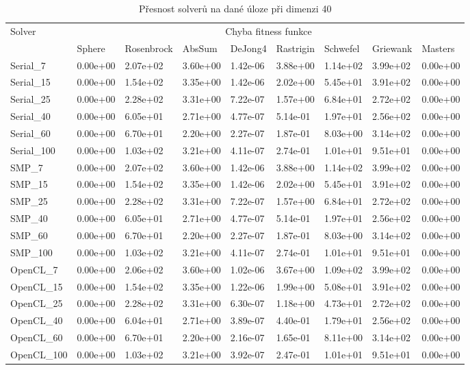 \documentclass[12pt, a4paper]{report}
\begin{document}
\begin{table}
	\scriptsize
	\caption{Přesnost solverů na dané úloze při dimenzi 40}
	\centering
	\label{tbl:results40}
	\begin{tabular}{l|l|l|l|l|l|l|l|l}
		\multirow{2}{*}{Solver} & \multicolumn{8}{c}{Chyba fitness funkce} \\
		& Sphere & Rosenbrock & AbsSum & DeJong4 & Rastrigin & Schwefel & Griewank & Masters \\
		\hline
		\hline
		Serial\_7 & 0.00e+00 & 2.07e+02 & 3.60e+00 & 1.42e-06 & 3.88e+00 & 1.14e+02 & 3.99e+02 & 0.00e+00 \\
		Serial\_15 & 0.00e+00 & 1.54e+02 & 3.35e+00 & 1.42e-06 & 2.02e+00 & 5.45e+01 & 3.91e+02 & 0.00e+00 \\
		Serial\_25 & 0.00e+00 & 2.28e+02 & 3.31e+00 & 7.22e-07 & 1.57e+00 & 6.84e+01 & 2.72e+02 & 0.00e+00 \\
		Serial\_40 & 0.00e+00 & 6.05e+01 & 2.71e+00 & 4.77e-07 & 5.14e-01 & 1.97e+01 & 2.56e+02 & 0.00e+00 \\
		Serial\_60 & 0.00e+00 & 6.70e+01 & 2.20e+00 & 2.27e-07 & 1.87e-01 & 8.03e+00 & 3.14e+02 & 0.00e+00 \\
		Serial\_100 & 0.00e+00 & 1.03e+02 & 3.21e+00 & 4.11e-07 & 2.74e-01 & 1.01e+01 & 9.51e+01 & 0.00e+00 \\
		\hline
		SMP\_7 & 0.00e+00 & 2.07e+02 & 3.60e+00 & 1.42e-06 & 3.88e+00 & 1.14e+02 & 3.99e+02 & 0.00e+00 \\
		SMP\_15 & 0.00e+00 & 1.54e+02 & 3.35e+00 & 1.42e-06 & 2.02e+00 & 5.45e+01 & 3.91e+02 & 0.00e+00 \\
		SMP\_25 & 0.00e+00 & 2.28e+02 & 3.31e+00 & 7.22e-07 & 1.57e+00 & 6.84e+01 & 2.72e+02 & 0.00e+00 \\
		SMP\_40 & 0.00e+00 & 6.05e+01 & 2.71e+00 & 4.77e-07 & 5.14e-01 & 1.97e+01 & 2.56e+02 & 0.00e+00 \\
		SMP\_60 & 0.00e+00 & 6.70e+01 & 2.20e+00 & 2.27e-07 & 1.87e-01 & 8.03e+00 & 3.14e+02 & 0.00e+00 \\
		SMP\_100 & 0.00e+00 & 1.03e+02 & 3.21e+00 & 4.11e-07 & 2.74e-01 & 1.01e+01 & 9.51e+01 & 0.00e+00 \\
		\hline
		OpenCL\_7 & 0.00e+00 & 2.06e+02 & 3.60e+00 & 1.02e-06 & 3.67e+00 & 1.09e+02 & 3.99e+02 & 0.00e+00 \\
		OpenCL\_15 & 0.00e+00 & 1.54e+02 & 3.35e+00 & 1.22e-06 & 1.99e+00 & 5.08e+01 & 3.91e+02 & 0.00e+00 \\
		OpenCL\_25 & 0.00e+00 & 2.28e+02 & 3.31e+00 & 6.30e-07 & 1.18e+00 & 4.73e+01 & 2.72e+02 & 0.00e+00 \\
		OpenCL\_40 & 0.00e+00 & 6.04e+01 & 2.71e+00 & 3.89e-07 & 4.40e-01 & 1.79e+01 & 2.56e+02 & 0.00e+00 \\
		OpenCL\_60 & 0.00e+00 & 6.70e+01 & 2.20e+00 & 2.16e-07 & 1.65e-01 & 8.11e+00 & 3.14e+02 & 0.00e+00 \\
		OpenCL\_100 & 0.00e+00 & 1.03e+02 & 3.21e+00 & 3.92e-07 & 2.47e-01 & 1.01e+01 & 9.51e+01 & 0.00e+00 \\
	\end{tabular}
\end{table}
\end{document}
